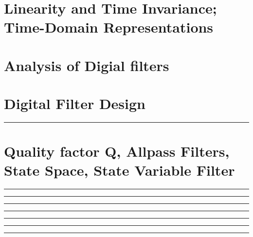 \documentclass[10pt]{article}
\begin{document}
\newcommand{\josquote}[1]{
    \framebox{
    \parbox{\textwidth}{
    \textit{#1}
    }
    }
}

\newcommand{\paulhint}[1]{
    #1
}

\setlength\parindent{0pt}
\section{Linearity and Time Invariance; Time-Domain Representations}
%
%
%
%
%
\section{Analysis of Digial filters}
%
%
%
%
%
\section{Digital Filter Design}
%
%
%
%
%
%

\noindent\rule[0.5ex]{\linewidth}{0.5pt}
\section{Quality factor Q, Allpass Filters, State Space, State Variable Filter}

\noindent\rule[0.5ex]{\linewidth}{0.5pt}

\noindent\rule[0.5ex]{\linewidth}{0.5pt}

\noindent\rule[0.5ex]{\linewidth}{0.5pt}

\noindent\rule[0.5ex]{\linewidth}{0.5pt}

\noindent\rule[0.5ex]{\linewidth}{0.5pt}

\noindent\rule[0.5ex]{\linewidth}{0.5pt}

\noindent\rule[0.5ex]{\linewidth}{0.5pt}

\end{document}
